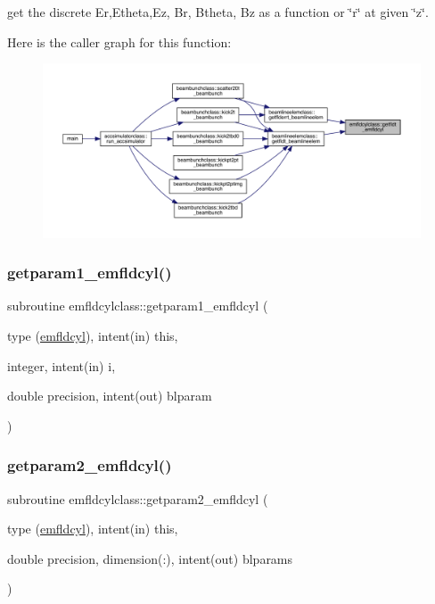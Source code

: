 get the discrete Er,Etheta,Ez, Br, Btheta, Bz as a function or \char`\"{}r\char`\"{} at given \char`\"{}z\char`\"{}. 

Here is the caller graph for this function\+:\nopagebreak
\begin{figure}[H]
\begin{center}
\leavevmode
\includegraphics[width=350pt]{namespaceemfldcylclass_a82e58a65bbe911b6f676ddb81868db31_icgraph}
\end{center}
\end{figure}
\mbox{\label{namespaceemfldcylclass_af1fa0868ef29363ce860ff3d67cb49ed}} 
\subsubsection{\texorpdfstring{getparam1\_emfldcyl()}{getparam1\_emfldcyl()}}
{\footnotesize\ttfamily subroutine emfldcylclass\+::getparam1\+\_\+emfldcyl (\begin{DoxyParamCaption}\item[{type (\mbox{\hyperlink{namespaceemfldcylclass_structemfldcylclass_1_1emfldcyl}{emfldcyl}}), intent(in)}]{this,  }\item[{integer, intent(in)}]{i,  }\item[{double precision, intent(out)}]{blparam }\end{DoxyParamCaption})}

\mbox{\label{namespaceemfldcylclass_a691ed53cff8adba275fc7b782c9065b8}} 
\subsubsection{\texorpdfstring{getparam2\_emfldcyl()}{getparam2\_emfldcyl()}}
{\footnotesize\ttfamily subroutine emfldcylclass\+::getparam2\+\_\+emfldcyl (\begin{DoxyParamCaption}\item[{type (\mbox{\hyperlink{namespaceemfldcylclass_structemfldcylclass_1_1emfldcyl}{emfldcyl}}), intent(in)}]{this,  }\item[{double precision, dimension(\+:), intent(out)}]{blparams }\end{DoxyParamCaption})}

